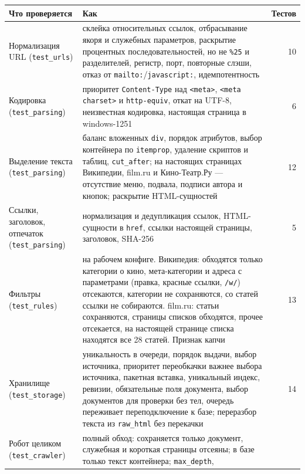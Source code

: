 \begin{center}
\begin{longtable}{|>{\raggedright\arraybackslash}p{4.8cm}|>{\raggedright\arraybackslash}p{8.2cm}|r|}
\hline
\textbf{Что проверяется} & \textbf{Как} & \textbf{Тестов} \\
\hline
\endhead
Нормализация URL (\texttt{test\_urls})
  & склейка относительных ссылок, отбрасывание якоря и служебных параметров,
    раскрытие процентных последовательностей, но не \texttt{\%25} и разделителей,
    регистр, порт, повторные слэши, отказ от \texttt{mailto:}/\texttt{javascript:},
    идемпотентность & 10 \\
\hline
Кодировка (\texttt{test\_parsing})
  & приоритет \texttt{Content-Type} над \texttt{<meta>}, \texttt{<meta charset>} и
    \texttt{http-equiv}, откат на UTF-8, неизвестная кодировка, настоящая страница
    в windows-1251 & 6 \\
\hline
Выделение текста (\texttt{test\_parsing})
  & баланс вложенных \texttt{div}, порядок атрибутов, выбор контейнера по
    \texttt{itemprop}, удаление скриптов и таблиц, \texttt{cut\_after}; на
    настоящих страницах Википедии, film.ru и Кино-Театр.Ру --- отсутствие меню,
    подвала, подписи автора и кнопок; раскрытие HTML-сущностей & 12 \\
\hline
Ссылки, заголовок, отпечаток (\texttt{test\_parsing})
  & нормализация и дедупликация ссылок, HTML-сущности в \texttt{href},
    ссылки настоящей страницы, заголовок, SHA-256 & 5 \\
\hline
Фильтры (\texttt{test\_rules})
  & на рабочем конфиге. Википедия: обходятся только категории о кино,
    мета-категории и адреса с параметрами (правка, красные ссылки,
    \texttt{/w/}) отсекаются, категории не сохраняются, со статей ссылки не
    собираются. film.ru: статьи сохраняются, страницы списков обходятся, прочее
    отсекается, на настоящей странице списка находятся все 28 статей. Признак
    капчи & 13 \\
\hline
Хранилище (\texttt{test\_storage})
  & уникальность в очереди, порядок выдачи, выбор источника, приоритет
    переобкачки важнее выбора источника, пакетная вставка, уникальный индекс, ревизии, обязательные поля
    документа, выбор документов для проверки без тел, очередь переживает
    переподключение к базе; переразбор текста из \texttt{raw\_html} без
    перекачки & 14 \\
\hline
Робот целиком (\texttt{test\_crawler})
  & полный обход: сохраняется только документ, служебная и короткая страницы
    отсеяны; в базе только текст контейнера; \texttt{max\_depth},

\end{longtable}
\end{center}
